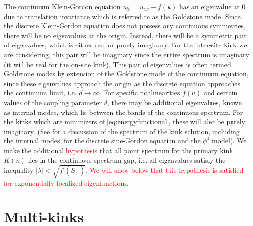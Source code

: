 \documentclass[12pt,reqno]{amsart}
\newcommand{\revised}[1]{ \textcolor{red}{#1} }
\begin{document}
The continuum Klein-Gordon equation $u_{tt} = u_{xx} - f(u)$ has an eigenvalue at 0 due to translation invariance which is referred to as the Goldstone mode. Since the discrete Klein-Gordon equation does not possess any continuous symmetries, there will be no eigenvalues at the origin. Instead, there will be a symmetric pair of eigenvalues, which is either real or purely imaginary. For the inter-site kink we are considering, this pair will be imaginary since the entire spectrum is imaginary (it will be real for the on-site kink). This pair of eigenvalues is often termed Goldstone modes by extension of the Goldstone mode of the continuum equation, since these eigenvalues approach the origin as the discrete equation approaches the continuum limit, i.e. $d \rightarrow \infty$. For specific nonlinearities $f(u)$ and certain values of the coupling parameter $d$, there may be additional eigenvalues, known as internal modes, which lie between the bands of the continuous spectrum. For the kinks which are minimizers of \cref{eq:energyfunctional}, these will also be purely imaginary. (See \cites{cretegny,KevrekidisWeinstein2000}
for a discussion of the spectrum of the kink solution, including the internal modes, for the discrete sine-Gordon equation and the $\phi^4$ model). We make the additional \revised{hypothesis} that all point spectrum for the primary kink $K(n)$ lies in the continuous spectrum gap, i.e. all eigenvalues satisfy the inequality $|\lambda| < \sqrt{f'(S^+)}$. \revised{We will show below that this hypothesis is satisfied for exponentially localized eigenfunctions.}

\section{Multi-kinks}\label{sec:multikink}
\end{document}
